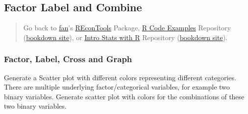 \documentclass[
]{book}
\begin{document}
\begin{table}[!h]
\centering
{}
\end{table}

\hypertarget{factor-label-and-combine}{%
\subsection{Factor Label and Combine}\label{factor-label-and-combine}}

\begin{quote}
Go back to \href{http://fanwangecon.github.io/}{fan}'s \href{https://fanwangecon.github.io/REconTools/}{REconTools} Package, \href{https://fanwangecon.github.io/R4Econ/}{R Code Examples} Repository (\href{https://fanwangecon.github.io/R4Econ/bookdown}{bookdown site}), or \href{https://fanwangecon.github.io/Stat4Econ/}{Intro Stats with R} Repository (\href{https://fanwangecon.github.io/Stat4Econ/bookdown}{bookdown site}).
\end{quote}

\hypertarget{factor-label-cross-and-graph}{%
\subsubsection{Factor, Label, Cross and Graph}\label{factor-label-cross-and-graph}}

Generate a Scatter plot with different colors representing different categories. There are multiple underlying factor/categorical variables, for example two binary variables. Generate scatter plot with colors for the combinations of these two binary variables.
\end{document}
